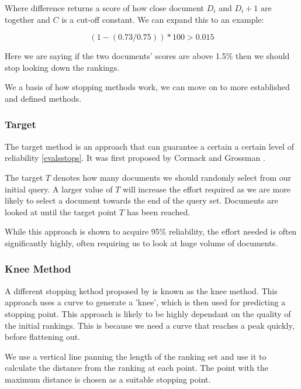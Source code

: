 Where difference returns a score of how close document $D_i$ and $D_i+1$ are together and $C$ is a cut-off constant. We can expand this to an example:

\begin{equation}
	  (1 -(0.73 / 0.75)) * 100 > 0.015
\end{equation}

Here we are saying if the two documents' scores are above 1.5\% then we should stop looking down the rankings.

We a basis of how stopping methods work, we can move on to more established and defined methods.


\subsubsection{Target} \label{target}

The target method is an approach that can guarantee a certain a certain level of reliability \ref{evalsstops}. It was first proposed by Cormack and Grossman \cite{Cormack2016}.

The target $T$ denotes how many documents we should randomly select from our initial query. A larger value of $T$ will increase the effort required as we are more likely to select a document towards the end of the query set. Documents are looked at until the target point $T$ has been reached.

While this approach is shown to acquire 95\% reliability, the effort needed is often significantly highly, often requiring us to look at huge volume of documents.

\subsubsection{Knee Method}

A different stopping kethod proposed by \cite{Satopa11} is known as the knee method. This approach uses a curve to generate a 'knee', which is then used for predicting a stopping point. This approach is likely to be highly dependant on the quality of the initial rankings. This is because we need a curve that reaches a peak quickly, before flattening out.

We use a vertical line panning the length of the ranking set and use it to calculate the distance from the ranking at each point. The point with the maximum distance is chosen as a suitable stopping point.

